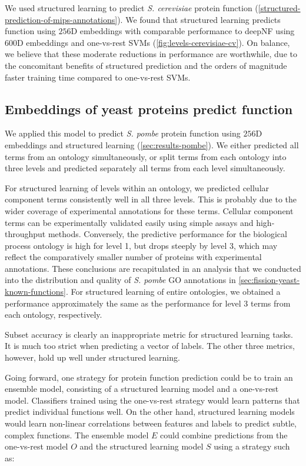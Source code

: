 We used structured learning to predict \emph{S. cerevisiae} protein function (\ref{structured-prediction-of-mips-annotations}).
We found that structured learning predicts function using $256$D embeddings with comparable performance to deepNF using $600$D embeddings and one-vs-rest SVMs (\ref{fig:levels-cerevisiae-cv}).
On balance, we believe that these moderate reductions in performance are worthwhile, due to the concomitant benefits of structured prediction and the orders of magnitude faster training time compared to one-vs-rest SVMs.

\subsection{Embeddings of yeast proteins predict function}

We applied this model to predict \emph{S. pombe} protein function using $256$D embeddings and structured learning  (\ref{sec:results-pombe}).
We either predicted all terms from an ontology simultaneously, or split terms from each ontology into three levels and predicted separately all terms from each level simultaneously.

For structured learning of levels within an ontology, we predicted cellular component terms consistently well in all three levels.
This is probably due to the wider coverage of experimental annotations for these terms.
Cellular component terms can be experimentally validated easily using simple assays and high-throughput methods.
Conversely, the predictive performance for the biological process ontology is high for level 1, but drops steeply by level 3, which may reflect the comparatively smaller number of proteins with experimental annotations.
These conclusions are recapitulated in an analysis that we conducted into the distribution and quality of \emph{S. pombe} GO annotations in \ref{sec:fission-yeast-known-functions}.
For structured learning of entire ontologies, we obtained a performance approximately the same as the performance for level 3 terms from each ontology, respectively.

Subset accuracy is clearly an inappropriate metric for structured learning tasks.
It is much too strict when predicting a vector of labels.
The other three metrics, however, hold up well under structured learning.

Going forward, one strategy for protein function prediction could be to train an ensemble model, consisting of a structured learning model and a one-vs-rest model.
Classifiers trained using the one-vs-rest strategy would learn patterns that predict individual functions well.
On the other hand, structured learning models would learn non-linear correlations between features and labels to predict subtle, complex functions.
The ensemble model $E$ could combine predictions from the one-vs-rest model $O$ and the structured learning model $S$ using a strategy such as:

